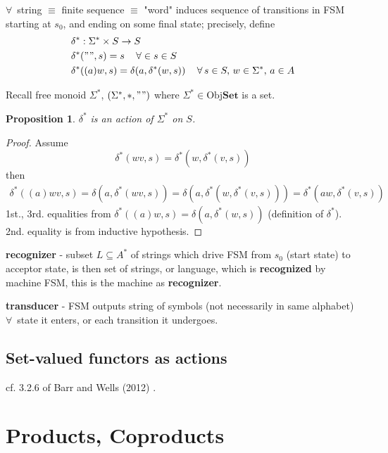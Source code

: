 \documentclass[10pt]{amsart}
\newtheorem{proposition}{Proposition}
\begin{document}
\begin{multicols*}{2}
$\forall \, $ string $\equiv $ finite sequence $\equiv $ "word" induces sequence of transitions in FSM starting at $s_0$, and ending on some final state; precisely, define
\[
\begin{aligned}
& \delta^* : \Sigma^* \times S \to S \\ 
& \delta^*("", s) = s \quad \, \forall \in s \in S \\ 
& \delta^*((a)w, s) = \delta(a, \delta^*(w,s)) \quad \, \forall \, s \in S, \, w\in \Sigma^*, \, a\in A
\end{aligned}
\]

Recall free monoid $\Sigma^*$, $(\Sigma^*, *, "")$ where $\Sigma^* \in \text{Obj}\mathbf{Set}$ is a set. \\

\begin{proposition}
	$\delta^*$ is an action of $\Sigma^*$ on $S$.
\end{proposition}

\begin{proof}
	Assume
	\[
	\delta^*(wv, s) = \delta^*(w, \delta^*(v,s))
	\]	
	then
	\[
	\begin{gathered}
		\delta^*((a)wv, s) = \delta(a, \delta^*(wv, s)) = \delta(a, \delta^*(w, \delta^*(v,s))) = \delta^*(aw, \delta^*(v,s)) 
	\end{gathered}
	\]
1st., 3rd. equalities from $\delta^*((a)w, s) = \delta(a, \delta^*(w,s))$ (definition of $\delta^*$). \\
2nd. equality is from inductive hypothesis.
\end{proof}

\textbf{recognizer} - subset $L\subseteq A^*$ of strings which drive FSM from $s_0$ (start state) to acceptor state, is then set of strings, or language, which is \textbf{recognized} by machine FSM, this is the machine as \textbf{recognizer}.

\textbf{transducer} - FSM outputs string of symbols (not necessarily in same alphabet) $\forall \, $ state it enters, or each transition it undergoes.

\subsection{Set-valued functors as actions}

cf. 3.2.6 of Barr and Wells (2012) \cite{BaWe2012}. 


\section{Products, Coproducts}


\end{multicols*}
\end{document}
